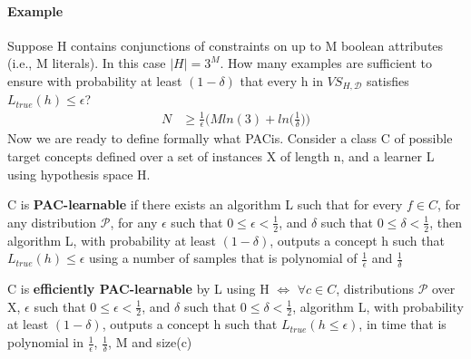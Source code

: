 \documentclass[main.tex]{subfiles}
\begin{document}
\paragraph{Example} Suppose H contains conjunctions of constraints on up to M boolean attributes (i.e., M literals). In this case $|H|=3^M$. How many examples are sufficient to ensure with probability at least $(1-\delta)$ that every h in $VS_{H,\mathcal{D}}$ satisfies $L_{true}(h) \leq \epsilon$?
\begin{align*}
    N &\geq \frac{1}{\epsilon} \bigg( Mln(3) + ln \bigg( \frac{1}{\delta} \bigg) \bigg)
\end{align*}
\newline
Now we are ready to define formally what PAC\footnotemark is. Consider a class C of possible target concepts defined over a set of instances X of length n, and a learner L using hypothesis space H. 
\begin{definition}
C is \textbf{PAC-learnable} if there exists an algorithm L such that for every $f \in C$, for any distribution $\mathcal{P}$, for any $\epsilon$ such that $0 \leq \epsilon < \frac{1}{2}$, and $\delta$ such that $0 \leq \delta < \frac{1}{2}$, then algorithm L, with probability at least $(1-\delta)$, outputs a concept h such that $L_{true}(h) \leq \epsilon$ using a number of samples that is polynomial of $\frac{1}{\epsilon}$ and $\frac{1}{\delta}$
\end{definition}
\begin{definition}
C is \textbf{efficiently PAC-learnable} by L using H $\iff$ $\forall c \in C$, distributions $\mathcal{P}$ over X, $\epsilon$ such that $0 \leq \epsilon < \frac{1}{2}$, and $\delta$ such that $0 \leq \delta < \frac{1}{2}$, algorithm L, with probability at least $(1-\delta)$, outputs a concept h such that $L_{true}(h \leq \epsilon)$, in time that is polynomial in $\frac{1}{\epsilon}$, $\frac{1}{\delta}$, M and size(c)\footnotemark
\end{definition} 
\end{document}
